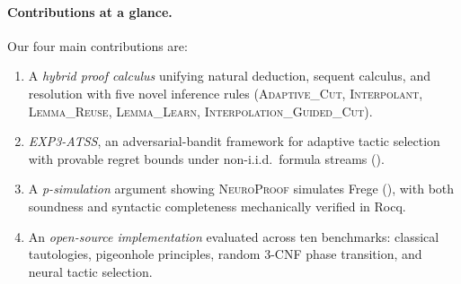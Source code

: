 \documentclass[conference]{IEEEtran}
\newcommand{\NP}{\textsc{NeuroProof}}
\begin{document}
\paragraph{Contributions at a glance.}
Our four main contributions are:
\begin{enumerate}
  \item A \emph{hybrid proof calculus} unifying natural deduction,
    sequent calculus, and resolution with five novel inference rules
    (\textsc{Adaptive\_Cut}, \textsc{Interpolant},
    \textsc{Lemma\_Reuse}, \textsc{Lemma\_Learn},
    \textsc{Interpolation\_Guided\_Cut}).
  \item \emph{EXP3-ATSS}, an adversarial-bandit framework for
    adaptive tactic selection with provable regret bounds under
    non-i.i.d.\ formula streams ().
  \item A \emph{p-simulation} argument showing \NP{} simulates Frege
    (), with both soundness and syntactic
    completeness mechanically verified in Rocq.
  \item An \emph{open-source implementation} evaluated across ten
    benchmarks: classical tautologies, pigeonhole principles, random
    3-CNF phase transition, and neural tactic selection.
\end{enumerate}
\end{document}
